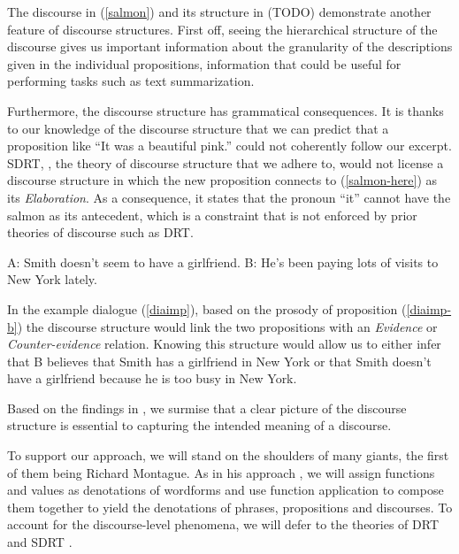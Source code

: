 
The discourse in (\ref{salmon}) and its structure in (TODO) demonstrate
another feature of discourse structures. First off, seeing the
hierarchical structure of the discourse gives us important information
about the granularity of the descriptions given in the individual
propositions, information that could be useful for performing tasks such
as text summarization.

Furthermore, the discourse structure has grammatical consequences. It is
thanks to our knowledge of the discourse structure that we can predict
that a proposition like ``It was a beautiful pink.''  could not
coherently follow our excerpt. SDRT, \cite{asher2003logics}, the theory
of discourse structure that we adhere to, would not license a discourse
structure in which the new proposition connects to (\ref{salmon-here})
as its \emph{Elaboration}. As a consequence, it states that the pronoun
``it'' cannot have the salmon as its antecedent, which is a constraint
that is not enforced by prior theories of discourse such as DRT.

\begin{exe}
  \ex \label{diaimp} \begin{xlist}
    \ex A: Smith doesn't seem to have a girlfriend.
    \ex \label{diaimp-b} B: He's been paying lots of visits to New York lately.
  \end{xlist}
\end{exe}

In the example dialogue (\ref{diaimp}), based on the prosody of
proposition (\ref{diaimp-b}) the discourse structure would link the two
propositions with an \emph{Evidence} or \emph{Counter-evidence}
relation. Knowing this structure would allow us to either infer that B
believes that Smith has a girlfriend in New York or that Smith doesn't
have a girlfriend because he is too busy in New York.

Based on the findings in \cite{asher2003logics}, we surmise that a clear
picture of the discourse structure is essential to capturing the
intended meaning of a discourse.

To support our approach, we will stand on the shoulders of many giants,
the first of them being Richard Montague. As in his approach
\cite{montague1973proper}, we will assign functions and values as
denotations of wordforms and use function application to compose them
together to yield the denotations of phrases, propositions and
discourses. To account for the discourse-level phenomena, we will defer
to the theories of DRT \cite{kamp1993discourse} and SDRT
\cite{asher2003logics}.

